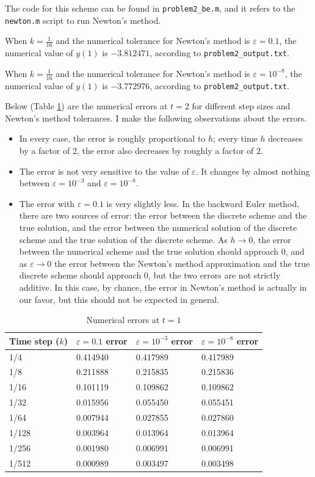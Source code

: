 \documentclass{homework}
\begin{document}
\begin{arabicparts}
		The code for this scheme can be found in \lstinline{problem2_be.m}, and it refers to the \lstinline{newton.m} script to run Newton's method.
		
		\questionpart When $k=\frac{1}{16}$ and the numerical tolerance for Newton's method is $\varepsilon = 0.1$, the numerical value of $y(1)$ is $-3.812471$, according to \lstinline{problem2_output.txt}.
		
		\questionpart When $k=\frac{1}{16}$ and the numerical tolerance for Newton's method is $\varepsilon = 10^{-8}$, the numerical value of $y(1)$ is $-3.772976$, according to \lstinline{problem2_output.txt}.
		
		\questionpart Below (Table \ref{table:p2}) are the numerical errors at $t=2$ for different step sizes and Newton's method tolerances. I make the following observations about the errors.
		\begin{itemize}
			\item In every case, the error is roughly proportional to $h$; every time $h$ decreases by a factor of 2, the error also decreases by roughly a factor of 2. 
			\item The error is not very sensitive to the value of $\varepsilon$. It changes by almost nothing between $\varepsilon = 10^{-3}$ and $\varepsilon = 10^{-8}$.
			\item The error with $\varepsilon=0.1$ is very slightly less. In the backward Euler method, there are two sources of error: the error between the discrete scheme and the true solution, and the error between the numerical solution of the discrete scheme and the true solution of the discrete scheme. As $h \to 0$, the error between the numerical scheme and the true solution should approach 0, and as $\varepsilon \to 0$ the error between the Newton's method approximation and the true discrete scheme should approach 0, but the two errors are not strictly additive. In this case, by chance, the error in Newton's method is actually in our favor, but this should not be expected in general.
		\end{itemize}
		\begin{table}[htb]
			\centering
			\begin{tabular}{@{}llll@{}}
				\toprule
				Time step ($k$) & $\varepsilon = 0.1$ error & $\varepsilon=10^{-3}$ error & $\varepsilon =10^{-8}$ error \\
				\midrule
				1/4 & 0.414940 & 0.417989 & 0.417989 \\
				1/8 & 0.211888 & 0.215835 & 0.215836 \\
				1/16 & 0.101119 & 0.109862 & 0.109862 \\
				1/32 & 0.015956 & 0.055450 & 0.055451 \\
				1/64 & 0.007944 & 0.027855 & 0.027860 \\
				1/128 & 0.003964 & 0.013964 & 0.013964 \\
				1/256 & 0.001980 & 0.006991 & 0.006991\\
				1/512 & 0.000989 & 0.003497 & 0.003498 \\
				\bottomrule
			\end{tabular}
			\caption{Numerical errors at $t=1$}
			\label{table:p2}
		\end{table}
	\end{arabicparts}
\end{document}
